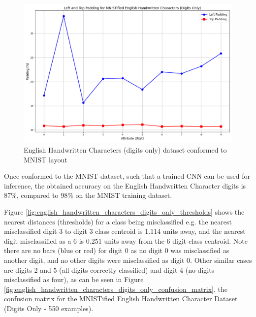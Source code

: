 
\begin{figure}[ht]
    \centering
    \includegraphics[width=0.99\columnwidth]{Figures/Results/HandwrittenCharacters/EHC_x_MNIST_training_testing_padding_plots.png}
    \caption{English Handwritten Characters (digits only) dataset conformed to MNIST layout}
\label{fig:EHC_x_MNIST_training_testing_padding_plots}
\end{figure}



Once conformed to the MNIST dataset, such that a trained CNN can be used for inference, the obtained accuracy on the English Handwritten Character digits is 87\%, compared to 98\% on the MNIST training dataset. 

Figure \ref{fig:english_handwritten_characters_digits_only_thresholds} shows the nearest distances (thresholds) for a class being misclassified e.g. the nearest misclassified digit 3 to digit 3 class centroid is 1.114 units away, and the nearest digit misclassified as a 6 is 0.251 units away from the 6 digit class centroid. Note there are no bars (blue or red) for digit 0 as no digit 0 was misclassified as another digit, and no other digits were misclassified as digit 0. Other similar cases are digits 2 and 5 (all digits correctly classified) and digit 4 (no digits misclassified as four), as can be seen in Figure \ref{fig:english_handwritten_characters_digits_only_confusion_matrix}, the confusion matrix for the MNISTified English Handwritten Character Dataset (Digits Only - 550 examples). 



